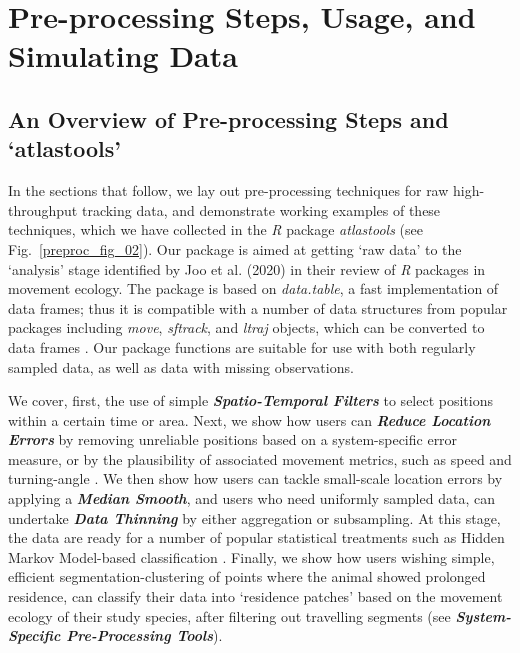     \section*{Pre-processing Steps, Usage, and Simulating Data}

    \subsection*{An Overview of Pre-processing Steps and `atlastools'}

    In the sections that follow, we lay out pre-processing techniques for raw high-throughput tracking data, and demonstrate working examples of these techniques, which we have collected in the \textit{R} package \textit{atlastools} (see Fig.~\ref{preproc_fig_02}).
    Our package is aimed at getting `raw data' to the `analysis' stage identified by Joo et al. (2020) in their review of \textit{R} packages in movement ecology.
    The package is based on \textit{data.table}, a fast implementation of data frames; thus it is compatible with a number of data structures from popular packages including \textit{move}, \textit{sftrack}, and \textit{ltraj} objects, which can be converted to data frames \citep[][]{kranstauber2011,boone2020,calenge2009}.
    Our package functions are suitable for use with both regularly sampled data, as well as data with missing observations.

    We cover, first, the use of simple \textit{\textbf{Spatio-Temporal Filters}} to select positions within a certain time or area.
    Next, we show how users can \textit{\textbf{Reduce Location Errors}} by removing unreliable positions based on a system-specific error measure, or by the plausibility of associated movement metrics, such as speed and turning-angle \citep{seidel2018, calenge2009}.
    We then show how users can tackle small-scale location errors by applying a \textit{\textbf{Median Smooth}}, and users who need uniformly sampled data, can undertake \textit{\textbf{Data Thinning}} by either aggregation or subsampling.
    At this stage, the data are ready for a number of popular statistical treatments such as Hidden Markov Model-based classification \citep{michelot2016,langrock2012}.
    Finally, we show how users wishing simple, efficient segmentation-clustering of points where the animal showed prolonged residence, can classify their data into `residence patches' \citep{barraquand2008, bijleveld2016} based on the movement ecology of their study species, after filtering out travelling segments (see \textit{\textbf{System-Specific Pre-Processing Tools}}).

